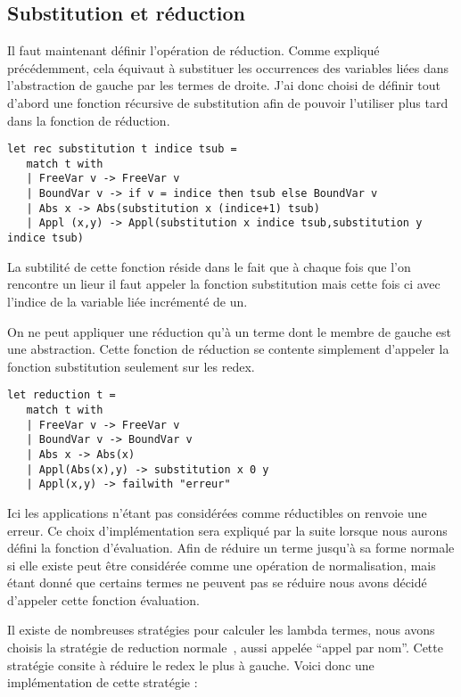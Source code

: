 \documentclass{article}
\theoremstyle{definition}
\theoremstyle{remark}
\begin{document}
\subsection{Substitution et réduction}

Il faut maintenant définir l'opération de réduction. Comme expliqué
précédemment, cela équivaut à substituer les occurrences des variables
liées dans l'abstraction de gauche par les termes de droite.  J'ai
donc choisi de définir tout d'abord une fonction récursive de
substitution afin de pouvoir l'utiliser plus tard dans la fonction de
réduction.  
% 
\begin{verbatim}
let rec substitution t indice tsub = 
   match t with 
   | FreeVar v -> FreeVar v 
   | BoundVar v -> if v = indice then tsub else BoundVar v 
   | Abs x -> Abs(substitution x (indice+1) tsub) 
   | Appl (x,y) -> Appl(substitution x indice tsub,substitution y indice tsub)
\end{verbatim}

La subtilité de cette fonction réside dans le fait que à
chaque fois que l'on rencontre un lieur il faut appeler la fonction
substitution mais cette fois ci avec l'indice de la variable liée
incrémenté de un.

On ne peut appliquer une réduction qu'à un terme dont le membre de
gauche est une abstraction.  Cette fonction de réduction se contente
simplement d'appeler la fonction substitution seulement sur les redex.
 
\begin{verbatim}
let reduction t = 
   match t with 
   | FreeVar v -> FreeVar v 
   | BoundVar v -> BoundVar v 
   | Abs x -> Abs(x) 
   | Appl(Abs(x),y) -> substitution x 0 y 
   | Appl(x,y) -> failwith "erreur"
\end{verbatim}

Ici les applications n'étant pas considérées comme réductibles on
renvoie une erreur.  Ce choix d'implémentation sera expliqué par la
suite lorsque nous aurons défini la fonction d'évaluation.  Afin de
réduire un terme jusqu'à sa forme normale si elle existe peut être
considérée comme une opération de normalisation, mais étant donné que
certains termes ne peuvent pas se réduire nous avons décidé d'appeler
cette fonction évaluation. 

Il existe de nombreuses stratégies pour calculer les lambda termes,
nous avons choisis la stratégie de reduction
normale~\citep{pierce:tapl}, aussi appelée ``appel par nom''.  Cette
stratégie consite à réduire le redex le plus à gauche. Voici donc une
implémentation de cette stratégie :
\end{document}
